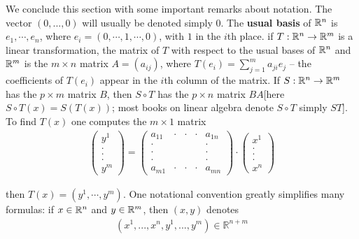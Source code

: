 We conclude this section with some important remarks
about notation. The vector $(0, . . . ,0)$ will usually be
denoted simply 0. The \textbf{usual basis} of $\mathbb{R}^n$ is $e_1, \cdots, e_n$, 
where $e_i = (0, \cdots, 1, \cdots, 0)$, with $1$ in the $i$th place.
if $T:\mathbb{R}^n \to \mathbb{R}^m$ is a linear transformation, the matrix of 
$T$ with respect to the usual bases of $\mathbb{R}^n$ and $\mathbb{R}^m$ is the 
$m\times n$ matrix $A = (a_{ij})$, where $T(e_i) = \sum_{j=1 }^{m }{a_{ji }e_j}$ 
-- the coefficients of $T(e_i)$ appear in the $i$th column of the matrix.
If $S:\mathbb{R}^n \to \mathbb{R}^m$ has the $p\times m$ matrix $B$, then $S\circ T$ has 
the $p\times n$ matrix $BA$[here $S\circ T(x) = S(T(x))$; most books on linear 
algebra denote $S\circ T$ simply $ST$].
To find $T(x)$ one computes the $m\times 1$ matrix
\begin{align*}
    \begin{pmatrix}
        y^1\\.\\.\\.\\y^m
    \end{pmatrix}
    =
    \begin{pmatrix}
        a_{11} & \cdot & \cdot & \cdot & a_{1n} \\
        \cdot  &       &       &       & \cdot \\
        \cdot  &       &       &       & \cdot \\
        \cdot  &       &       &       & \cdot \\
        a_{m1} & \cdot & \cdot & \cdot & a_{mn}
    \end{pmatrix}
    \cdot
    \begin{pmatrix}
        x^1\\.\\.\\.\\x^n
    \end{pmatrix}
\end{align*}  

then $T(x) = (y^1, \cdots, y^m)$. One notational convention greatly 
simplifies many formulas: if $x\in \mathbb{R}^n$ and $y\in \mathbb{R}^m$, then 
$(x, y)$ denotes 
\begin{align*}
  (x^1,...,x^n,y^1,...,y^m)\in\mathbb{R}^{n+m}
\end{align*}


